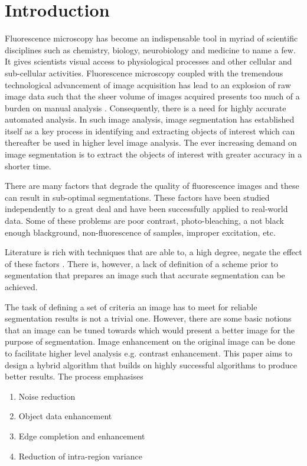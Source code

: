 \documentclass[a4paper,11pt]{ijamas}
\begin{document}
\section{Introduction}
\label{sec:intro}
Fluorescence microscopy has become an indispensable tool \cite{pmatula:2012} in myriad of scientific disciplines such as chemistry, biology, neurobiology and medicine to name a few. It gives scientists visual access to physiological processes and other cellular and sub-cellular activities.
Fluorescence microscopy coupled with the tremendous technological advancement of image acquisition has lead to an explosion of raw image data such that the sheer volume of images acquired presents too much of a burden on manual analysis \cite{pmatula:2012}.
Consequently, there is a need for highly accurate automated analysis.
In such image analysis, image segmentation has established itself as a key process in identifying and extracting objects of interest which can thereafter be used in higher level image analysis.
The ever increasing demand on image segmentation is to extract the objects of interest with greater accuracy in a shorter time.

There are many factors that degrade the quality of fluorescence images and these can result in sub-optimal segmentations.
These factors have been studied independently to a great deal and have been successfully applied to real-world data.
Some of these problems are poor contrast, photo-bleaching, a not black enough blackground, non-fluorescence of samples, improper excitation, etc.

Literature is rich with techniques that are able to, a high degree, negate the effect of these factors \cite{lysaker:2004,wang:2008,zhou:2013}. There is, however, a lack of definition of a scheme prior to segmentation that prepares an image such that accurate segmentation can be achieved.

The task of defining a set of criteria an image has to meet for reliable segmentation results is not a trivial one. However, there are some basic notions that an image can be tuned towards which would present a better image for the purpose of segmentation.
Image enhancement on the original image can be done to facilitate higher level analysis e.g. contrast enhancement.
This paper aims to design a hybrid algorithm that builds on highly successful algorithms to produce better results. The process emphasises
\begin{enumerate}
\item Noise reduction
\item Object data enhancement
\item Edge completion and enhancement
\item Reduction of intra-region variance
\end{enumerate}
\end{document}
